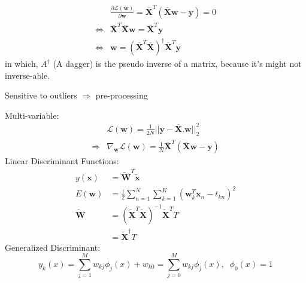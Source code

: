 \begin{align}
	&\frac{\partial\mathcal{L}(\textbf{w})}{\partial\textbf{w}} = \overline{\textbf{X}}^T\left(\overline{\textbf{X}}\textbf{w}-\textbf{y}\right) = 0 \\
	\iff &\overline{\textbf{X}}^T\overline{\textbf{X}}\textbf{w} = \overline{\textbf{X}}^T\textbf{y} \\
	\iff &\textbf{w} = \left(\overline{\textbf{X}}^T\overline{\textbf{X}}\right)^\dagger\overline{\textbf{X}}^T\textbf{y}
\end{align}
in which, $A^\dagger$ (A dagger) is the pseudo inverse of a matrix, because it's might not inverse-able. 

\note Sensitive to outliers $\Rightarrow$ pre-processing

Multi-variable:
\begin{align*}
	&\mathcal{L}(\textbf{w}) = \frac{1}{2N} ||\textbf{y}-\overline{\textbf{X}}.\textbf{w}||^2_2 \\
	\Rightarrow &\nabla_\textbf{w}\mathcal{L}(\textbf{w}) = \frac{1}{N} \overline{\textbf{X}}^T(\overline{\textbf{X}}\textbf{w}-\textbf{y})
\end{align*}
Linear Discriminant Functions:
\begin{align*}
	y(\textbf{x}) &= \widetilde{\textbf{W}}^T\widetilde{\textbf{x}} \\
	E(\textbf{w}) &= \frac{1}{2} \sum_{n=1}^{N} \sum_{k=1}^{K} \left(\textbf{w}_k^T\textbf{x}_n-t_{kn}\right)^2 \\
	\widetilde{\textbf{W}} &= \left(\widetilde{\textbf{X}}^T\widetilde{\textbf{X}}\right)^{-1}\widetilde{\textbf{X}}^TT \\
	&= \widetilde{\textbf{X}}^\dagger T
\end{align*}
Generalized Discriminant:
\begin{equation}
	y_k(x) = \sum_{j=1}^{M}w_{kj}\phi_j(x) + w_{k0} = \sum_{j=0}^M w_{kj}\phi_j(x), \;\;\phi_0(x) = 1
\end{equation}